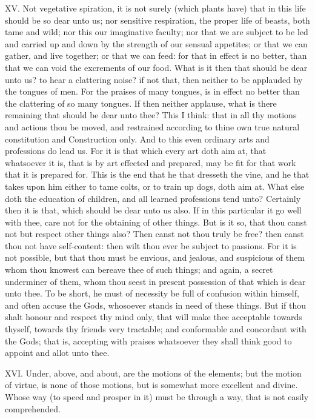 XV. Not vegetative spiration, it is not surely (which plants have) that
in this life should be so dear unto us; nor sensitive respiration, the
proper life of beasts, both tame and wild; nor this our imaginative
faculty; nor that we are subject to be led and carried up and down by the
strength of our sensual appetites; or that we can gather, and live
together; or that we can feed: for that in effect is no better, than that
we can void the excrements of our food. What is it then that should be
dear unto us? to hear a clattering noise? if not that, then neither to be
applauded by the tongues of men. For the praises of many tongues, is in
effect no better than the clattering of so many tongues. If then neither
applause, what is there remaining that should be dear unto thee? This I
think: that in all thy motions and actions thou be moved, and restrained
according to thine own true natural constitution and Construction only.
And to this even ordinary arts and professions do lead us. For it is that
which every art doth aim at, that whatsoever it is, that is by art
effected and prepared, may be fit for that work that it is prepared for.
This is the end that he that dresseth the vine, and he that takes upon him
either to tame colts, or to train up dogs, doth aim at. What else doth the
education of children, and all learned professions tend unto? Certainly
then it is that, which should be dear unto us also. If in this particular
it go well with thee, care not for the obtaining of other things. But is
it so, that thou canst not but respect other things also? Then canst not
thou truly be free? then canst thou not have self-content: then wilt thou
ever be subject to passions. For it is not possible, but that thou must be
envious, and jealous, and suspicious of them whom thou knowest can bereave
thee of such things; and again, a secret underminer of them, whom thou
seest in present possession of that which is dear unto thee. To be short,
he must of necessity be full of confusion within himself, and often accuse
the Gods, whosoever stands in need of these things. But if thou shalt
honour and respect thy mind only, that will make thee acceptable towards
thyself, towards thy friends very tractable; and conformable and
concordant with the Gods; that is, accepting with praises whatsoever they
shall think good to appoint and allot unto thee.

XVI. Under, above, and about, are the motions of the elements; but
the motion of virtue, is none of those motions, but is somewhat more
excellent and divine. Whose way (to speed and prosper in it) must be
through a way, that is not easily comprehended.

